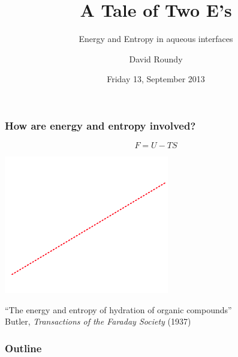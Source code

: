\documentclass{beamer}
\title{A Tale of Two E's}
\subtitle{Energy and Entropy in aqueous interfaces}
\author{David Roundy}
\date{Friday 13, September 2013}
\newcommand\mycite[3]{{\small #1, \textit{#2} (#3)}}
\begin{document}
{
\begin{frame}
  \titlepage

\end{frame}
}

\begin{frame}
  \frametitle{How are energy and entropy involved?}
  \vspace{-1em}
  \[F = U - TS\]
  \begin{center}
    \includegraphics[height=6cm]{figs/hydration-plot-nice}
  \end{center}
  ``The energy and entropy of hydration of organic compounds''
  \\ \hfill \mycite{Butler}{Transactions of the Faraday Society}{1937}
\end{frame}

\begin{frame}
  \frametitle{Outline}
  \tableofcontents
\end{frame}








\end{document}
